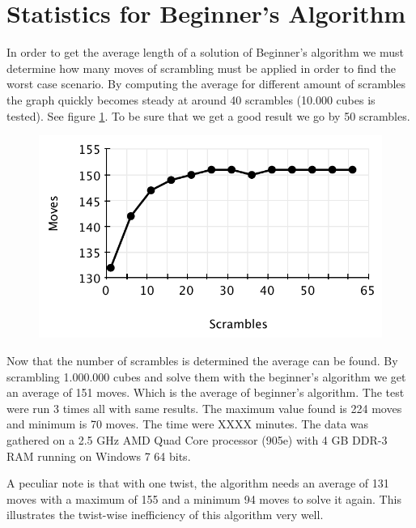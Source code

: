 \section{Statistics for Beginner's Algorithm}
\label{sec:beginnersStat}
In order to get the average length of a solution of Beginner's algorithm we must determine how many moves of scrambling must be applied in order to find the worst case scenario. 
By computing the average for different amount of scrambles the graph quickly becomes steady at around 40 scrambles (10.000 cubes is tested). See figure \ref{fig:beginnersScramble}. To be sure that we get a good result we go by 50 scrambles.
\begin{figure}[htbp]
	\centering
		\includegraphics{input/pics/beginnersScramble.pdf}
	\caption{}
	\label{fig:beginnersScramble}
\end{figure}

Now that the number of scrambles is determined the average can be found.
By scrambling 1.000.000 cubes and solve them with the beginner's algorithm we get an average of 151 moves. 
Which is the average of beginner's algorithm. The test were run 3 times all with same results.
The maximum value found is 224 moves and minimum is 70 moves. The time were XXXX minutes. 
The data was gathered on a 2.5 GHz AMD Quad Core processor (905e) with 4 GB DDR-3 RAM running on Windows 7 64 bits.

A peculiar note is that with one twist, the algorithm needs an average of 131 moves with a maximum of 155 and a minimum 94 moves to solve it again.
This illustrates the twist-wise inefficiency of this algorithm very well.


